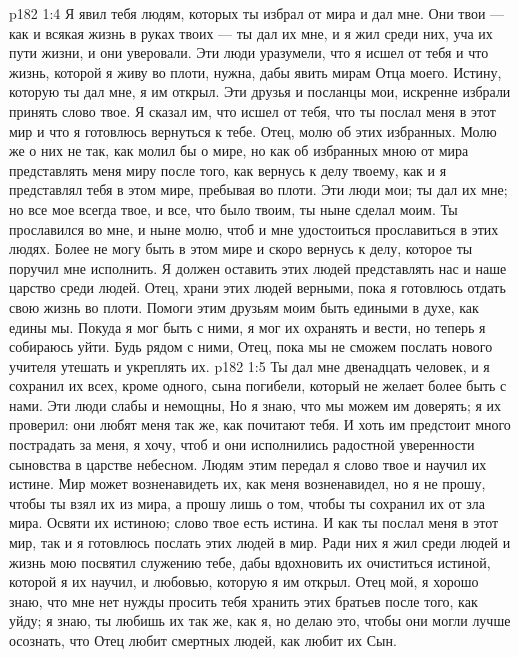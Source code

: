\vs p182 1:4 Я явил тебя людям, которых ты избрал от мира и дал мне. Они твои --- как и всякая жизнь в руках твоих --- ты дал их мне, и я жил среди них, уча их пути жизни, и они уверовали. Эти люди уразумели, что я исшел от тебя и что жизнь, которой я живу во плоти, нужна, дабы явить мирам Отца моего. Истину, которую ты дал мне, я им открыл. Эти друзья и посланцы мои, искренне избрали принять слово твое. Я сказал им, что исшел от тебя, что ты послал меня в этот мир и что я готовлюсь вернуться к тебе. Отец, молю об этих избранных. Молю же о них не так, как молил бы о мире, но как об избранных мною от мира представлять меня миру после того, как вернусь к делу твоему, как и я представлял тебя в этом мире, пребывая во плоти. Эти люди мои; ты дал их мне; но все мое всегда твое, и все, что было твоим, ты ныне сделал моим. Ты прославился во мне, и ныне молю, чтоб и мне удостоиться прославиться в этих людях. Более не могу быть в этом мире и скоро вернусь к делу, которое ты поручил мне исполнить. Я должен оставить этих людей представлять нас и наше царство среди людей. Отец, храни этих людей верными, пока я готовлюсь отдать свою жизнь во плоти. Помоги этим друзьям моим быть едиными в духе, как едины мы. Покуда я мог быть с ними, я мог их охранять и вести, но теперь я собираюсь уйти. Будь рядом с ними, Отец, пока мы не сможем послать нового учителя утешать и укреплять их.
\vs p182 1:5 Ты дал мне двенадцать человек, и я сохранил их всех, кроме одного, сына погибели, который не желает более быть с нами. Эти люди слабы и немощны, Но я знаю, что мы можем им доверять; я их проверил: они любят меня так же, как почитают тебя. И хоть им предстоит много пострадать за меня, я хочу, чтоб и они исполнились радостной уверенности сыновства в царстве небесном. Людям этим передал я слово твое и научил их истине. Мир может возненавидеть их, как меня возненавидел, но я не прошу, чтобы ты взял их из мира, а прошу лишь о том, чтобы ты сохранил их от зла мира. Освяти их истиною; слово твое есть истина. И как ты послал меня в этот мир, так и я готовлюсь послать этих людей в мир. Ради них я жил среди людей и жизнь мою посвятил служению тебе, дабы вдохновить их очиститься истиной, которой я их научил, и любовью, которую я им открыл. Отец мой, я хорошо знаю, что мне нет нужды просить тебя хранить этих братьев после того, как уйду; я знаю, ты любишь их так же, как я, но делаю это, чтобы они могли лучше осознать, что Отец любит смертных людей, как любит их Сын.
